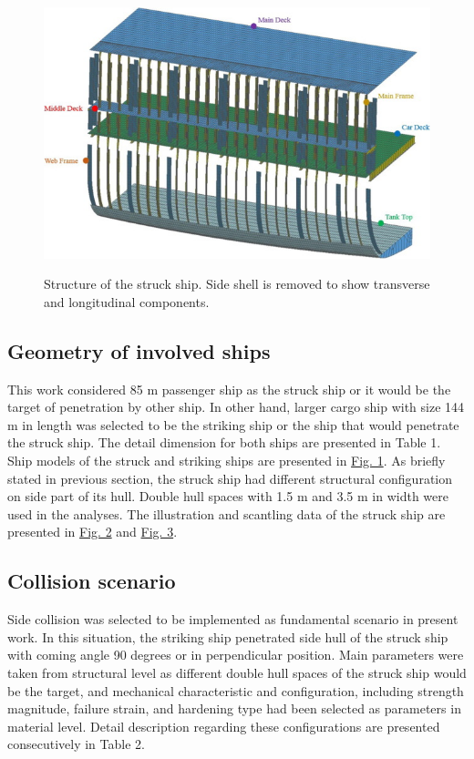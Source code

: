 \documentclass[../Final.tex]{subfiles}
\begin{document}
\begin{figure}[h]
    \centering
    \includegraphics[width=\columnwidth]{fig3.jpg}
    \label{fig3}
    \caption{Structure of the struck ship. Side shell is removed to show transverse and longitudinal components.}
\end{figure}

\subsection{Geometry of involved ships}

This work considered 85 m passenger ship as the struck ship or it would be the target of penetration by other ship. 
In other hand, larger cargo ship with size 144 m in length was selected to be the striking ship or the ship that would penetrate the struck ship. 
The detail dimension for both ships are presented in Table 1. Ship models of the struck and striking ships are presented in \hyperref[fig1]{Fig. 1}. 
As briefly stated in previous section, the struck ship had different structural configuration on side part of its hull. Double hull spaces with 1.5 m and 3.5 m in width were used in the analyses. 
The illustration and scantling data of the struck ship are presented in \hyperref[fig2]{Fig. 2} and \hyperref[fig3]{Fig. 3}. 

\subsection{Collision scenario}

Side collision was selected to be implemented as fundamental scenario in present work. 
In this situation, the striking ship penetrated side hull of the struck ship with coming angle 90 degrees or in perpendicular position. 
Main parameters were taken from structural level as different double hull spaces of the struck ship would be the target, and mechanical character­istic and configuration, including strength magnitude, 
failure strain, and hardening type had been selected as parameters in material level. Detail description regarding these configurations are presented consecutively in Table 2. 
\end{document}
